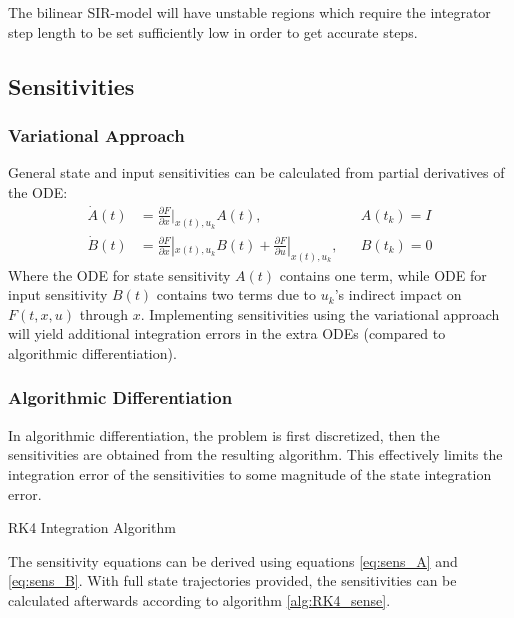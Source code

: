 The bilinear SIR-model will have unstable regions which require the integrator step length to be set sufficiently low in order to get accurate steps.

\subsection{Sensitivities}


\subsubsection{Variational Approach}
General state and input sensitivities can be calculated from partial derivatives of the ODE:
\begin{align}
    \dot{A}(t) &= \frac{\partial F}{\partial x}|_{x(t),u_k} A(t), & &A(t_k) = I\label{eq:sens_A}\\
    \dot{B}(t) &= \frac{\partial F}{\partial x}|_{x(t), u_k} B(t) + \frac{\partial F}{\partial u}|_{x(t), u_k}, & &B(t_k) = 0 \label{eq:sens_B}
\end{align}
Where the ODE for state sensitivity $A(t)$ contains one term, while ODE for input sensitivity $B(t)$ contains two terms due to $u_k$'s indirect impact on $F(t, x, u)$ through $x$. Implementing sensitivities using the variational approach will yield additional integration errors in the extra ODEs (compared to algorithmic differentiation).

\subsubsection{Algorithmic Differentiation}
In algorithmic differentiation, the problem is first discretized, then the sensitivities are obtained from the resulting algorithm. This effectively limits the integration error of the sensitivities to some magnitude of the state integration error.
\begin{algorithm}[H]
\SetAlgoLined
{}
 \caption{RK4 Integration Algorithm}
\end{algorithm}
The sensitivity equations can be derived using equations \ref{eq:sens_A} and \ref{eq:sens_B}. With full state trajectories provided, the sensitivities can be calculated afterwards according to algorithm \ref{alg:RK4_sense}.

